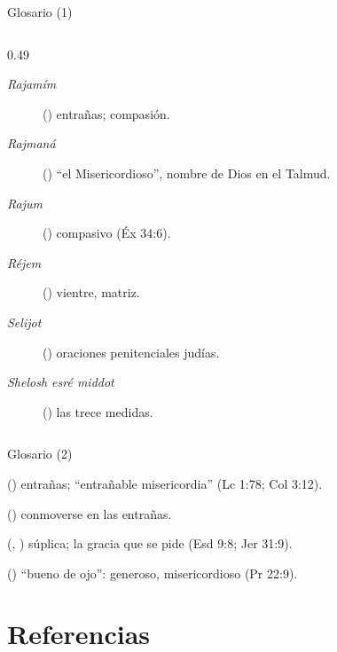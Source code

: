 \begin{frame}{Glosario (1)}
\begin{columns}[t,onlytextwidth]
\begin{column}{0.49\textwidth}
\begin{description}
\item[\emph{Rajamím}] () entrañas; compasión.
\item[\emph{Rajmaná}] () ``el Misericordioso'', nombre de Dios en el Talmud.
\item[\emph{Rajum}] () compasivo (Éx 34:6).
\item[\emph{Réjem}] () vientre, matriz.
\item[\emph{Selijot}] () oraciones penitenciales judías.
\item[\emph{Shelosh esré middot}] () las trece medidas.
\end{description}
\end{column}
\end{columns}
\end{frame}

\begin{frame}{Glosario (2)}
\scriptsize
\begin{description}\setlength{\itemsep}{1pt}
\item[\emph{Splánjna}] () entrañas; ``entrañable misericordia'' (Lc 1:78; Col 3:12).
\item[\emph{Splanjnízomai}] () conmoverse en las entrañas.
\item[\emph{Tejinná}, \emph{tajanunim}] (, ) súplica; la gracia que se pide (Esd 9:8; Jer 31:9).
\item[\emph{Tov ayin}] () ``bueno de ojo'': generoso, misericordioso (Pr 22:9).
\end{description}
\end{frame}

\section{Referencias}

